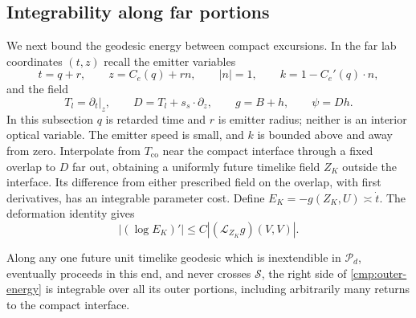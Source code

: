 \subsection{Integrability along far portions}

We next bound the geodesic energy between compact excursions. In the
far lab coordinates $(t,z)$ recall the emitter variables
\[
 t=q+r,\qquad z=C_e(q)+rn,\qquad |n|=1,
 \qquad k=1-C_e'(q)\cdot n,
\]
and the field
\[
 T_l=\partial_t|_z,\qquad D=T_l+s_s\cdot\partial_z,
 \qquad g=B+h,\qquad \psi=Dh.
\]
In this subsection $q$ is retarded time and $r$ is emitter radius;
neither is an interior optical variable. The emitter speed is small,
and $k$ is bounded above and away from zero. Interpolate from
$T_{\mathrm{co}}$ near the compact interface through a fixed overlap
to $D$ far out, obtaining a uniformly future timelike field $Z_K$
outside the interface. Its difference from either prescribed field on
the overlap, with first derivatives, has an integrable parameter cost.
Define $E_K=-g(Z_K,U)\asymp\dot t$. The deformation identity gives
\begin{equation}\label{cmp:outer-energy}
 |(\log E_K)'|
       \leq C|(\mathcal L_{Z_K}g)(V,V)|.
\end{equation}

\begin{lemma}\label{cmp:outer-integrability}
Along any one future unit timelike geodesic which is inextendible in
$\mathcal P_d$, eventually proceeds in this end, and never crosses
$\mathcal S$, the right side of
\eqref{cmp:outer-energy} is integrable over all its outer portions,
including arbitrarily many returns to the compact interface.
\end{lemma}

